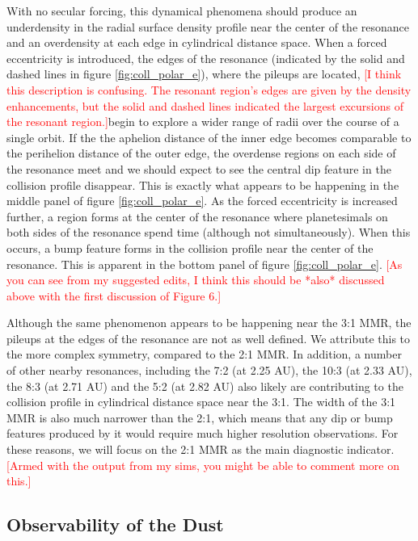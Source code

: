 \documentclass[twocolumn]{aastex63}
\newcommand{\ACBc}[1]{\textcolor{red}{#1}}
\begin{document}
With no secular forcing, this dynamical phenomena should produce an underdensity in the radial surface density profile near the center of the 
resonance and an overdensity at each edge in cylindrical distance space. When a forced eccentricity is introduced, the edges of the resonance 
(indicated by the solid and dashed lines in figure \ref{fig:coll_polar_e}), where the pileups are located, \ACBc{[I think this description is confusing. The resonant region's edges are given by the density enhancements, but the solid and dashed lines indicated the largest excursions of the resonant region.]}begin to explore a wider range of radii over the 
course of a single orbit. If the the aphelion distance of the inner edge becomes comparable to the perihelion distance of the outer edge, the 
overdense regions on each side of the resonance meet and we should expect to see the central dip feature in the collision profile disappear. This is 
exactly what appears to be happening in the middle panel of figure \ref{fig:coll_polar_e}. As the forced eccentricity is increased further, a region 
forms at the center of the resonance where planetesimals on both sides of the resonance spend time (although not simultaneously). When this 
occurs, a bump feature forms in the collision profile near the center of the resonance. This is apparent in the bottom panel of figure 
\ref{fig:coll_polar_e}.  \ACBc{[As you can see from my suggested edits, I think this should be *also* discussed above with the first discussion of Figure 6.]}

Although the same phenomenon appears to be happening near the 3:1 MMR, the pileups at the edges of the resonance are not as well defined. We 
attribute this to the more complex symmetry, compared to the 2:1 MMR. In addition, a number of other nearby resonances, including the 7:2 (at 
2.25 AU), the 10:3 (at 2.33 AU), the 8:3 (at 2.71 AU) and the 5:2 (at 2.82 AU) also likely are contributing to the collision profile in cylindrical distance 
space near the 3:1. The width of the 3:1 MMR is also much narrower than the 2:1, which means that any dip or bump features produced by it would 
require much higher resolution observations. For these reasons, we will focus on the 2:1 MMR as the main diagnostic indicator. \ACBc{[Armed with the output from my sims, you might be able to comment more on this.]}

\subsection{Observability of the Dust}
\end{document}

